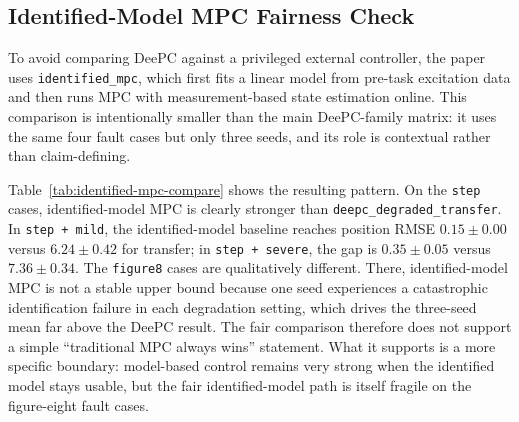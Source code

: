 \documentclass[12pt,a4paper]{article}
\begin{document}
\subsection{Identified-Model MPC Fairness Check}

To avoid comparing DeePC against a privileged external controller, the paper uses \texttt{identified\_mpc}, which first fits a linear model from pre-task excitation data and then runs MPC with measurement-based state estimation online. This comparison is intentionally smaller than the main DeePC-family matrix: it uses the same four fault cases but only three seeds, and its role is contextual rather than claim-defining.

Table~\ref{tab:identified-mpc-compare} shows the resulting pattern. On the \texttt{step} cases, identified-model MPC is clearly stronger than \texttt{deepc\_degraded\_transfer}. In \texttt{step + mild}, the identified-model baseline reaches position RMSE $0.15 \pm 0.00$ versus $6.24 \pm 0.42$ for transfer; in \texttt{step + severe}, the gap is $0.35 \pm 0.05$ versus $7.36 \pm 0.34$. The \texttt{figure8} cases are qualitatively different. There, identified-model MPC is not a stable upper bound because one seed experiences a catastrophic identification failure in each degradation setting, which drives the three-seed mean far above the DeePC result. The fair comparison therefore does not support a simple ``traditional MPC always wins'' statement. What it supports is a more specific boundary: model-based control remains very strong when the identified model stays usable, but the fair identified-model path is itself fragile on the figure-eight fault cases.
\end{document}

